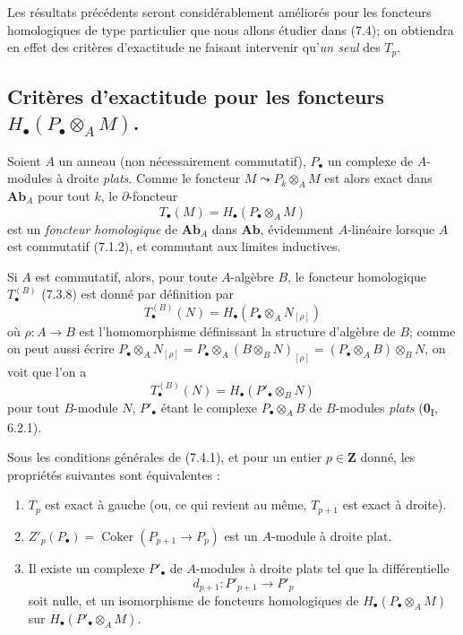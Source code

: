 Les résultats précédents seront considérablement améliorés pour les foncteurs
homologiques de type particulier que nous allons étudier dans (7.4); on
obtiendra en effet des critères d'exactitude ne faisant intervenir qu'\emph{un seul}
des $T_p$.

\subsection{Critères d'exactitude pour les foncteurs
$H_\bullet(P_\bullet\otimes_A M)$.}
\label{subsection:III.7.4.fr}

\begin{env}[7.4.1]
Soient $A$ un anneau (non nécessairement commutatif), $P_\bullet$ un complexe
de $A$-modules à droite \emph{plats}. Comme le foncteur
$M\leadsto P_k\otimes_A M$ est alors exact dans $\boldsymbol{Ab}_A$ pour tout $k$,
le $\partial$-foncteur
\[
  T_\bullet(M)=H_\bullet(P_\bullet\otimes_A M)
  \tag{7.4.1.1}\label{III.7.4.1.1.fr}
\]
est un \emph{foncteur homologique} de $\boldsymbol{Ab}_A$ dans $\boldsymbol{Ab}$,
évidemment $A$-linéaire lorsque $A$ est commutatif (7.1.2), et commutant aux
limites inductives.

Si $A$ est commutatif, alors, pour toute $A$-algèbre $B$, le foncteur
homologique $T_\bullet^{(B)}$ (7.3.8) est donné par définition par
\[
  T_\bullet^{(B)}(N)
  =
  H_\bullet(P_\bullet\otimes_A N_{[\rho]})
  \tag{7.4.1.2}\label{III.7.4.1.2.fr}
\]
où $\rho:A\to B$ est l'homomorphisme définissant la structure d'algèbre de
$B$; comme on peut aussi écrire
$P_\bullet\otimes_A N_{[\rho]}=P_\bullet\otimes_A(B\otimes_B N)_{[\rho]}=(P_\bullet\otimes_A B)\otimes_B N$,
on voit que l'on a
\[
  T_\bullet^{(B)}(N)=H_\bullet(P'_\bullet\otimes_B N)
  \tag{7.4.1.3}\label{III.7.4.1.3.fr}
\]
pour tout $B$-module $N$, $P'_\bullet$ étant le complexe
$P_\bullet\otimes_A B$ de $B$-modules \emph{plats} (\textbf{0}\textsubscript{I}, 6.2.1).
\end{env}

\begin{proposition}[7.4.2]
Sous les conditions générales de \textup{(7.4.1)}, et pour un entier $p\in\mathbf Z$
donné, les propriétés suivantes sont équivalentes :
\begin{enumerate}
  \item[a)] $T_p$ est exact à gauche \textup{(ou, ce qui revient au même,} $T_{p+1}$
    est exact à droite).
  \item[b)] $Z'_p(P_\bullet)=\operatorname{Coker}(P_{p+1}\longrightarrow P_p)$
    est un $A$-module à droite plat.
  \item[c)] Il existe un complexe $P'_\bullet$ de $A$-modules à droite plats
    tel que la différentielle
    \[
      d_{p+1}:P'_{p+1}\longrightarrow P'_p
    \]
    soit nulle, et un isomorphisme de foncteurs homologiques de
    $H_\bullet(P_\bullet\otimes_A M)$ sur
    $H_\bullet(P'_\bullet\otimes_A M)$.
\end{enumerate}
\end{proposition}

